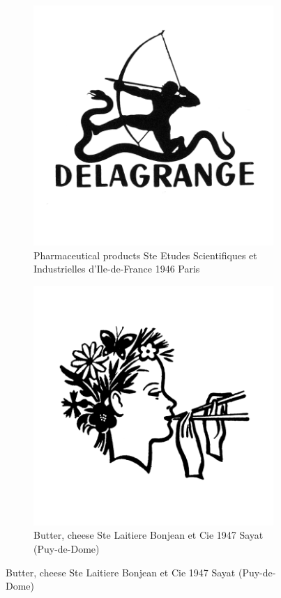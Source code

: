 \begin{figure}[h]
  \begin{subfigure}{.45\textwidth}
    \centering
    \includegraphics[width=.5\linewidth]{images/supplement/trademarks/french/2_10}
    \caption[]{Pharmaceutical products Ste Etudes Scientifiques et Industrielles d'Ile-de-France 1946 Paris}
    \label{fig:trademarks:french:2.10}
  \end{subfigure}\hfill
  \begin{subfigure}{.45\textwidth}
    \centering
    \includegraphics[width=.5\linewidth]{images/supplement/trademarks/french/2_11}
    \caption[]{Butter, cheese Ste Laitiere Bonjean et Cie 1947 Sayat (Puy-de-Dome)}
    \label{fig:trademarks:french:2.11}
  \end{subfigure}
\end{figure}

\clearpage


